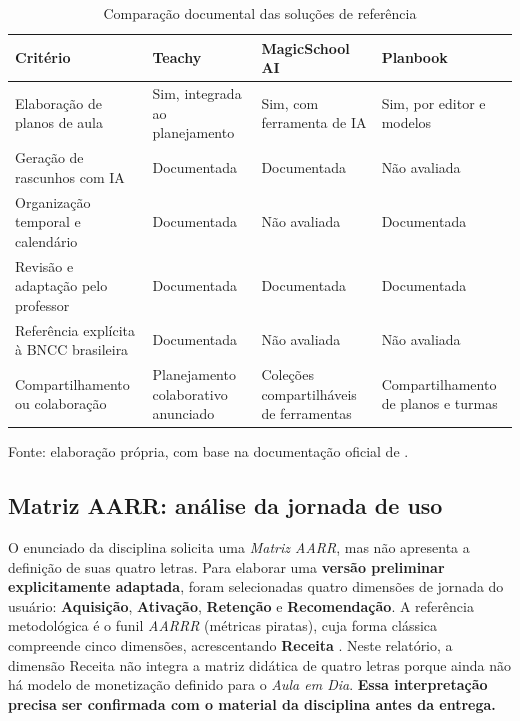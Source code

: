 \begin{table}[htbp]
\centering
\caption{Comparação documental das soluções de referência}
\label{tab:comparacao-benchmark}
\footnotesize
\renewcommand{\arraystretch}{1.3}
\begin{tabularx}{\textwidth}{@{}p{2.8cm}XXX@{}}
\toprule
\textbf{Critério} & \textbf{Teachy} & \textbf{MagicSchool AI} & \textbf{Planbook} \\
\midrule
Elaboração de planos de aula & Sim, integrada ao planejamento & Sim, com ferramenta de IA & Sim, por editor e modelos \\
Geração de rascunhos com IA & Documentada & Documentada & Não avaliada \\
Organização temporal e calendário & Documentada & Não avaliada & Documentada \\
Revisão e adaptação pelo professor & Documentada & Documentada & Documentada \\
Referência explícita à BNCC brasileira & Documentada & Não avaliada & Não avaliada \\
Compartilhamento ou colaboração & Planejamento colaborativo anunciado & Coleções compartilháveis de ferramentas & Compartilhamento de planos e turmas \\
\bottomrule
\end{tabularx}
\par\smallskip
\begin{minipage}{\textwidth}\footnotesize Fonte: elaboração própria, com base na documentação oficial de \citet{teachy_planejamento2026,teachy_ferramentas2026,magicschool_planos2026,magicschool_ferramentas2026,planbook_professores2026}.\end{minipage}
\end{table}

\subsection{Matriz AARR: análise da jornada de uso}
O enunciado da disciplina solicita uma \emph{Matriz AARR}, mas não apresenta a definição de suas quatro letras. Para elaborar uma \textbf{versão preliminar explicitamente adaptada}, foram selecionadas quatro dimensões de jornada do usuário: \textbf{Aquisição}, \textbf{Ativação}, \textbf{Retenção} e \textbf{Recomendação}. A referência metodológica é o funil \textit{AARRR} (métricas piratas), cuja forma clássica compreende cinco dimensões, acrescentando \textbf{Receita} \citep{amazon_aarrr}. Neste relatório, a dimensão Receita não integra a matriz didática de quatro letras porque ainda não há modelo de monetização definido para o \textit{Aula em Dia}. \textbf{Essa interpretação precisa ser confirmada com o material da disciplina antes da entrega.}

